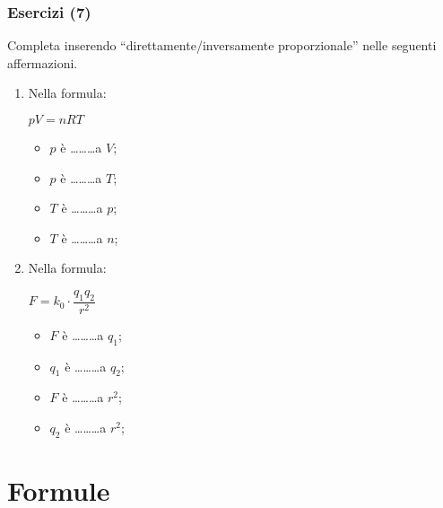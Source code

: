 \documentclass[]{beamer}
\begin{document}
\begin{frame}
\frametitle{Esercizi (7)}
Completa inserendo ``direttamente/inversamente proporzionale'' nelle seguenti affermazioni.
\begin{enumerate}
  \item Nella formula:\begin{center}
  $ pV = nRT $
  \end{center}
  \begin{multicols}{2}
    \begin{itemize}
        \item $ p $ è \ldots \ldots \ldots a $ V $;
        \item $ p $ è \ldots \ldots \ldots a $ T $;
        \item $ T $ è \ldots \ldots \ldots a $ p $;
        \item $ T $ è \ldots \ldots \ldots a $ n $;
    \end{itemize}
  \end{multicols}
  \item Nella formula:\begin{center}
  $ F = k_0 \cdot \dfrac{q_1 q_2}{r^2} $
  \end{center}
  \begin{multicols}{2}
    \begin{itemize}
        \item $ F $ è \ldots \ldots \ldots a $ q_1 $;
        \item $ q_1 $ è \ldots \ldots \ldots a $ q_2 $;
        \item $ F $ è \ldots \ldots \ldots a $ r^2 $;
        \item $ q_2 $ è \ldots \ldots \ldots a $ r^2 $;
    \end{itemize}
  \end{multicols}
\end{enumerate}
\end{frame}


\section{Formule}
\end{document}
